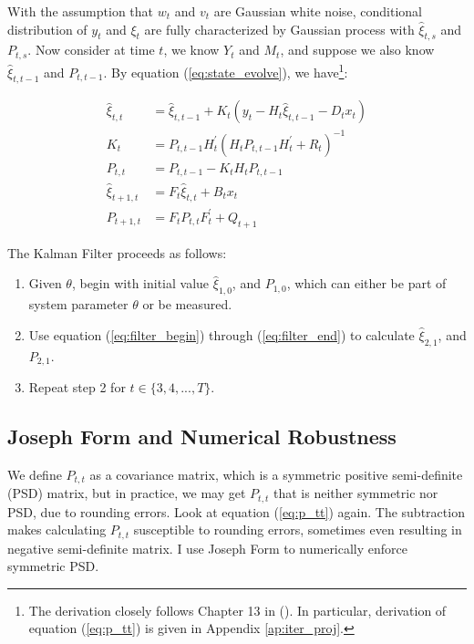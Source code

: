 \documentclass[12pt]{article}
\newenvironment{boenumerate}
    {\begin{enumerate}\renewcommand\labelenumi{\textbf\theenumi}}
    {\end{enumerate}}
\numberwithin{equation}{section}
\begin{document}
With the assumption that $w_t$ and $v_t$ are Gaussian white noise, conditional distribution of $y_t$ and $\xi_t$ are fully characterized by Gaussian process with $\hat{\xi}_{t,s}$ and $P_{t,s}$. Now consider at time $t$, we know $Y_t$ and $M_t$, and suppose we also know $\hat{\xi}_{t,t-1}$ and $P_{t,t-1}$. By equation (\ref{eq:state_evolve}), we have\footnote{The derivation closely follows Chapter 13 in (\cite{hamilton_1994}). In particular, derivation of equation (\ref{eq:p_tt}) is given in Appendix \ref{ap:iter_proj}.}:

\begin{align}
    \hat{\xi}_{t,t} &= \hat{\xi}_{t,t-1} + K_t(y_t-H_t\hat{\xi}_{t,t-1}-D_tx_t) \label{eq:filter_begin} \\
    K_t &= P_{t,t-1}H_t^{'}(H_tP_{t,t-1}H_t^{'}+R_t)^{-1} \label{eq:gain} \\
    P_{t,t} &= P_{t,t-1} - K_tH_tP_{t,t-1} \label{eq:p_tt} \\
    \hat{\xi}_{t+1,t} &= F_t\hat{\xi}_{t,t} + B_tx_t \\
    P_{t+1,t} &= F_tP_{t,t}F_t^{'}+Q_{t+1} \label{eq:filter_end}
\end{align}

The Kalman Filter proceeds as follows:

\begin{boenumerate}
    \item Given $\theta$, begin with initial value $\hat{\xi}_{1,0}$, and $P_{1,0}$, which can either be part of system parameter $\theta$ or be measured. 
    \item Use equation (\ref{eq:filter_begin}) through (\ref{eq:filter_end}) to calculate $\hat{\xi}_{2,1}$, and $P_{2,1}$.
    \item Repeat step 2 for $t\in\{3, 4, ..., T\}$.
\end{boenumerate}

\subsection{Joseph Form and Numerical Robustness}

We define $P_{t,t}$ as a covariance matrix, which is a symmetric positive semi-definite (PSD) matrix, but in practice, we may get $P_{t,t}$ that is neither symmetric nor PSD, due to rounding errors. Look at equation (\ref{eq:p_tt}) again. The subtraction makes calculating $P_{t,t}$ susceptible to rounding errors, sometimes even resulting in negative semi-definite matrix. I use Joseph Form to numerically enforce symmetric PSD. 
\end{document}
